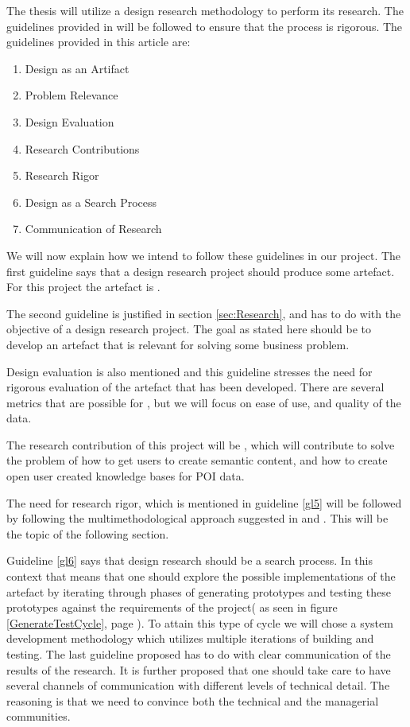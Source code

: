 The thesis will utilize a design research methodology to perform its research. 
The guidelines provided in \citet{Hevner2004} will be followed to ensure that the process is rigorous.
The guidelines provided in this article are:
\begin{enumerate}
    \item \label{gl1}Design as an Artifact
    \item \label{gl2}Problem Relevance
    \item \label{gl3}Design Evaluation
    \item \label{gl4}Research Contributions
    \item \label{gl5}Research Rigor
    \item \label{gl6}Design as a Search Process
    \item \label{gl7}Communication of Research
\end{enumerate}

We will now explain how we intend to follow these guidelines in our project.
The first guideline says that a design research project should produce some artefact. For this project the artefact is \theartefact. 

The second guideline is justified in section \ref{sec:Research}, and has to do with the objective of a design research project. 
The goal as stated here should be to develop an artefact that is relevant for solving some business problem.

Design evaluation is also mentioned and this guideline stresses the need for rigorous evaluation of the artefact that has been developed.
There are several metrics that are possible for \theartefact, but we will focus on ease of use, and quality of the data.

The research contribution of this project will be \theartefact, which will contribute to solve the problem of how to get users to create semantic content, and how to create open user created knowledge bases for POI data.

The need for research rigor, which is mentioned in guideline \ref{gl5} will be followed by following the multimethodological approach suggested in \citet{Chen1990} and \citet{NunamakerJr1990}. 
This will be the topic of the following section.

Guideline \ref{gl6} says that design research should be a search process. 
In this context that means that one should explore the possible implementations of the artefact by iterating through phases of generating prototypes and testing these prototypes against the requirements of the project( as seen in figure \ref{GenerateTestCycle}, page \pageref{GenerateTestCycle}).
To attain this type of cycle we will chose a system development methodology which utilizes multiple iterations of building and testing.
The last guideline proposed has to do with clear communication of the results of the research. 
It is further proposed that one should take care to have several channels of communication with different levels of technical detail.
The reasoning is that we need to convince both the technical and the managerial communities. 

